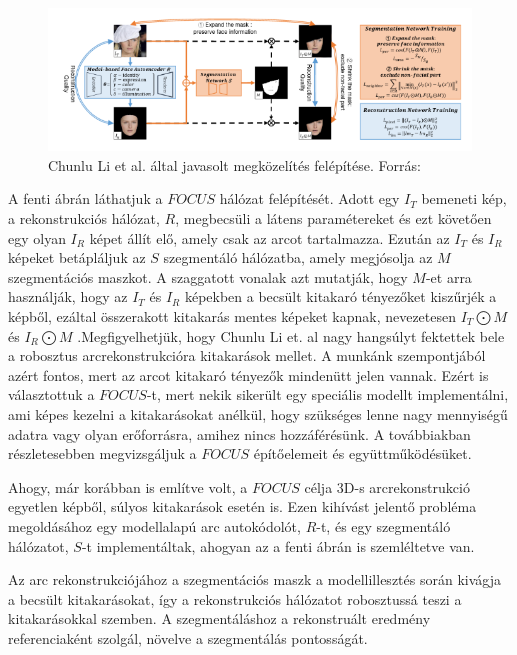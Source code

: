 \documentclass[12pt,a4]{article}
\begin{document}
            \begin{figure}[h]	
     		 \centering
     		 \includegraphics[width=1\linewidth]{focus}
     		 \caption{Chunlu Li et al. által javasolt megközelítés felépítése.
     			    Forrás:\cite{focus}}
                    \label{fig:focus}
     	      \end{figure}

            A fenti ábrán láthatjuk a $FOCUS$ hálózat felépítését.
            Adott egy $I_{T}$ bemeneti kép, a rekonstrukciós hálózat, $R$, megbecsüli a látens
     	      paramétereket és ezt követően egy olyan $I_{R}$ képet állít elő, amely csak az
     	      arcot tartalmazza. Ezután az $I_{T}$ és $I_{R}$ képeket betápláljuk az 
            $S$ szegmentáló hálózatba, amely megjósolja az $M$ szegmentációs maszkot. A szaggatott vonalak azt mutatják, hogy $M$-et arra használják, hogy az $I_{T}$ és $I_{R}$ képekben a becsült kitakaró tényezőket kiszűrjék a képből, ezáltal összerakott kitakarás mentes képeket kapnak, nevezetesen $I_{T}\bigodot M$ és $I_{R}\bigodot M$ .Megfigyelhetjük, hogy Chunlu Li et. al nagy hangsúlyt fektettek bele a robosztus arcrekonstrukcióra kitakarások mellet. A munkánk szempontjából
     	      azért fontos, mert az arcot kitakaró tényezők mindenütt jelen vannak. 
            Ezért is választottuk a $FOCUS$-t, mert nekik sikerült egy speciális modellt implementálni, ami képes kezelni a kitakarásokat anélkül, hogy szükséges lenne nagy mennyiségű adatra vagy olyan erőforrásra, amihez nincs hozzáférésünk.
     	      A továbbiakban részletesebben megvizsgáljuk a $FOCUS$ építőelemeit és
     	      együttműködésüket.

            Ahogy, már korábban is említve volt, a $FOCUS$ célja 3D-s
     	      arcrekonstrukció egyetlen képből, súlyos kitakarások esetén is. Ezen kihívást
     	      jelentő probléma megoldásához egy modellalapú arc autokódolót, $R$-t, és
     	      egy szegmentáló hálózatot, $S$-t implementáltak, ahogyan az a fenti ábrán is
     	      szemléltetve van.
    
            Az arc rekonstrukciójához a szegmentációs maszk a modellillesztés során
     	      kivágja a becsült kitakarásokat, így a rekonstrukciós hálózatot robosztussá
     	      teszi a kitakarásokkal szemben. A szegmentáláshoz a rekonstruált eredmény
     	      referenciaként szolgál, növelve a szegmentálás pontosságát.
    
\end{document}
